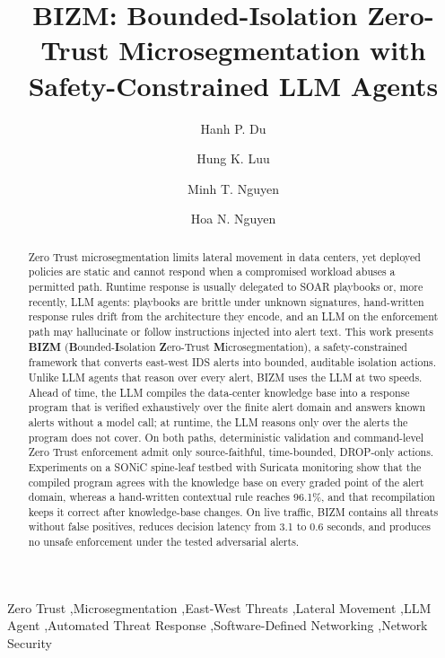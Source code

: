 \documentclass[final,5p]{elsarticle}
\begin{document}
\begin{frontmatter}

\title{BIZM: Bounded-Isolation Zero-Trust Microsegmentation with Safety-Constrained LLM Agents}

\author{Hanh P. Du}

\author{Hung K. Luu}

\author{Minh T. Nguyen}

\author{Hoa N. Nguyen}



\begin{abstract}
Zero Trust microsegmentation limits lateral movement in data centers, yet deployed policies are static and cannot respond when a compromised workload abuses a permitted path. Runtime response is usually delegated to SOAR playbooks or, more recently, LLM agents: playbooks are brittle under unknown signatures, hand-written response rules drift from the architecture they encode, and an LLM on the enforcement path may hallucinate or follow instructions injected into alert text. This work presents \textbf{BIZM} (\textbf{B}ounded-\textbf{I}solation \textbf{Z}ero-Trust \textbf{M}icrosegmentation), a safety-constrained framework that converts east-west IDS alerts into bounded, auditable isolation actions. Unlike LLM agents that reason over every alert, BIZM uses the LLM at two speeds. Ahead of time, the LLM compiles the data-center knowledge base into a response program that is verified exhaustively over the finite alert domain and answers known alerts without a model call; at runtime, the LLM reasons only over the alerts the program does not cover. On both paths, deterministic validation and command-level Zero Trust enforcement admit only source-faithful, time-bounded, DROP-only actions. Experiments on a SONiC spine-leaf testbed with Suricata monitoring show that the compiled program agrees with the knowledge base on every graded point of the alert domain, whereas a hand-written contextual rule reaches 96.1\%, and that recompilation keeps it correct after knowledge-base changes. On live traffic, BIZM contains all threats without false positives, reduces decision latency from 3.1 to 0.6 seconds, and produces no unsafe enforcement under the tested adversarial alerts.
\end{abstract}

\begin{keyword}
Zero Trust \sep Microsegmentation \sep East-West Threats \sep Lateral Movement \sep LLM Agent \sep Automated Threat Response \sep Software-Defined Networking \sep Network Security
\end{keyword}

\end{frontmatter}
\end{document}
